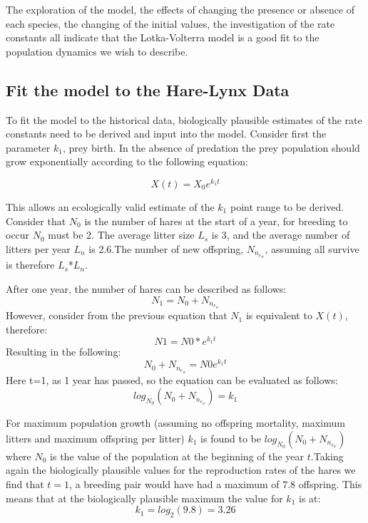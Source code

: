 \documentclass{article}
\begin{document}
The exploration of the model, the effects of changing the presence or absence of each species, the changing of the initial values, the investigation of the rate constants all indicate that the Lotka-Volterra model is a good fit to the population dynamics we wish to describe.

\subsection{Fit the model to the Hare-Lynx Data}
To fit the model to the historical data, biologically plausible estimates of the rate constants need to be derived and input into the model. Consider first the parameter $k_1$, prey birth. In the absence of predation the prey population should grow exponentially according to the following equation: 

\begin{equation}
    X(t) = X_0e^{k_1t}
\end{equation}

This allows an ecologically valid estimate of the $k_1$ point range to be derived. Consider that $N_0$ is the number of hares at the start of a year, for breeding to occur $N_0$ must be 2. The average litter size $L_s$ is 3, and the average number of litters per year $L_n$ is 2.6.The number of new offspring, $N_n_e_w$, assuming all survive is therefore $L_s$*$L_n$.

After one year, the number of hares can be described as follows:
\begin{equation*}
    N_1 = N_0 + N_n_e_w
\end{equation*}
However, consider from the previous equation that $N_1$ is equivalent to $X(t)$, therefore:
\begin{equation*}
    N1 = N0 * e^{k_1t}
\end{equation*}
Resulting in the following:
\begin{equation*}
    N_0 + N_n_e_w = N0e^{k_1t}
\end{equation*}
Here t=1, as 1 year has passed, so the equation can be evaluated as follows: 
\begin{equation*}
    log_N_0(N_0 + N_n_e_w) = k_1
\end{equation*}

For maximum population growth (assuming no offspring mortality, maximum litters and maximum offspring per litter) $k_1$ is found to be $log_N_0(N_0 + N_n_e_w)$ where $N_0$ is the value of the population at the beginning of the year $t$.Taking again the biologically plausible values for the reproduction rates of the hares we find that $t = 1$, a breeding pair would have had a maximum of $7.8$ offspring. This means that at the biologically plausible maximum the value for $k_1$ is at:
\begin{equation}
    k_1 = log_2(9.8) = 3.26
\end{equation}
\end{document}
